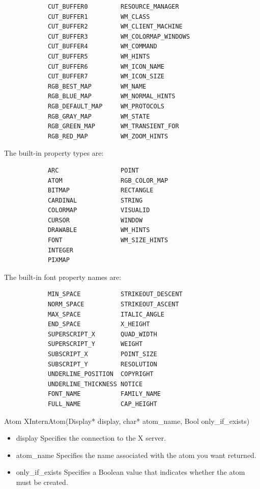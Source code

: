 \documentclass{report}
\begin{document}
\begin{itemize}
        \begin{verbatim}
            CUT_BUFFER0         RESOURCE_MANAGER
            CUT_BUFFER1         WM_CLASS
            CUT_BUFFER2         WM_CLIENT_MACHINE
            CUT_BUFFER3         WM_COLORMAP_WINDOWS
            CUT_BUFFER4         WM_COMMAND
            CUT_BUFFER5         WM_HINTS
            CUT_BUFFER6         WM_ICON_NAME
            CUT_BUFFER7         WM_ICON_SIZE
            RGB_BEST_MAP        WM_NAME
            RGB_BLUE_MAP        WM_NORMAL_HINTS
            RGB_DEFAULT_MAP     WM_PROTOCOLS
            RGB_GRAY_MAP        WM_STATE
            RGB_GREEN_MAP       WM_TRANSIENT_FOR
            RGB_RED_MAP         WM_ZOOM_HINTS
        \end{verbatim}
        The built-in property types are:
        \begin{verbatim}
            ARC                 POINT
            ATOM                RGB_COLOR_MAP
            BITMAP              RECTANGLE
            CARDINAL            STRING
            COLORMAP            VISUALID
            CURSOR              WINDOW
            DRAWABLE            WM_HINTS
            FONT                WM_SIZE_HINTS
            INTEGER
            PIXMAP 
        \end{verbatim}
        The built-in font property names are:
        \begin{verbatim}
            MIN_SPACE           STRIKEOUT_DESCENT
            NORM_SPACE          STRIKEOUT_ASCENT
            MAX_SPACE           ITALIC_ANGLE
            END_SPACE           X_HEIGHT
            SUPERSCRIPT_X       QUAD_WIDTH
            SUPERSCRIPT_Y       WEIGHT
            SUBSCRIPT_X         POINT_SIZE
            SUBSCRIPT_Y         RESOLUTION
            UNDERLINE_POSITION  COPYRIGHT
            UNDERLINE_THICKNESS NOTICE
            FONT_NAME           FAMILY_NAME
            FULL_NAME           CAP_HEIGHT 
        \end{verbatim}
        \bigbreak \noindent 
        \begin{cppcode}
            Atom XInternAtom(Display* display, char* atom_name, Bool only_if_exists)
        \end{cppcode}
        \begin{itemize}
            \item display Specifies the connection to the X server.
            \item atom\_name Specifies the name associated with the atom you want returned.
            \item only\_if\_exists Specifies a Boolean value that indicates whether the atom must be created.

\end{itemize}
\end{itemize}
\end{document}
